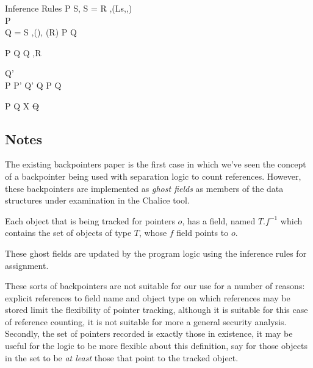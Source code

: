 \documentclass[a4paper]{article}
\begin{document}
\begin{display}{Inference Rules}
    {\tr P {} {S\sep\rv\doteq{}} \qquad
    S = R \sep \getValue(Ls,,)\\
      {} P\\
     Q = S \sep \isfalse()\sep\rv\doteq\und\qquad
     \rv\not\in \fv(R)}
    {\tr P {} Q}
  \vg

    {\tr P {} Q}
    { {} {Q \sep R}}

    { {} {Q'} \\
     P \impl P' \quad Q' \impl Q}
    {\tr P {} Q}
  \vg

    {\tr P {} Q}
    { {} {\exists X \st Q}}

    { \quad {}}
    {}

\end{display}

\subsection{Notes}
The existing backpointers paper\cite{KassiosKritikos12} is the first case in
which we've seen the concept of a backpointer being used with separation logic
to count references. However, these backpointers are implemented as \emph{ghost
fields} as members of the data structures under examination in the Chalice
tool.

Each object that is being tracked for pointers $o$, has a field, named $T.f^{-1}$
which contains the set of objects of type $T$, whose $f$ field
points to $o$.

These ghost fields are updated by the program logic using the inference rules
for assignment.

These sorts of backpointers are not suitable for our use for a number of
reasons: explicit references to field name and object type on
which references may be stored limit the flexibility of pointer tracking,
although it is suitable for this case of reference counting, it is not suitable
for more a general security analysis. Secondly, the set of pointers recorded is
exactly those in existence, it may be useful for the logic to be more flexible
about this definition, say for those objects in the set to be \emph{at least}
those that point to the tracked object.
\end{document}
